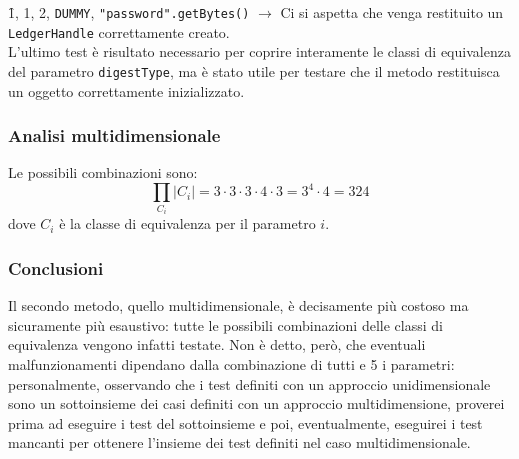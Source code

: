 \documentclass[a4paper, 12pt]{article}
\newcommand{\key}[1]{\texttt{#1}}
\begin{document}
\f{1, 1, 2, \key{DUMMY}, \key{"password".getBytes()}} $\rightarrow$ Ci si aspetta che venga restituito un \key{LedgerHandle} correttamente creato. \\

L'ultimo test è risultato necessario per coprire interamente le classi di equivalenza del parametro \key{digestType}, ma è stato utile per testare che il metodo restituisca un oggetto correttamente inizializzato. 

\subsubsection{Analisi multidimensionale}
Le possibili combinazioni sono: 
\[
\prod_{C_i}{|C_i|} = 3 \cdot 3 \cdot 3 \cdot 4 \cdot 3 = 3^4 \cdot 4 = 324
\]
dove $C_i$ è la classe di equivalenza per il parametro $i$.

\subsubsection{Conclusioni}
Il secondo metodo, quello multidimensionale, è decisamente più costoso ma sicuramente più esaustivo: tutte le possibili combinazioni delle classi di equivalenza vengono infatti testate. Non è detto, però, che eventuali malfunzionamenti dipendano dalla combinazione di tutti e 5 i parametri: personalmente, osservando che i test definiti con un approccio unidimensionale sono un sottoinsieme dei casi definiti con un approccio multidimensione, proverei prima ad eseguire i test del sottoinsieme e poi, eventualmente, eseguirei i test mancanti per ottenere l'insieme dei test definiti nel caso multidimensionale. 
\end{document}

